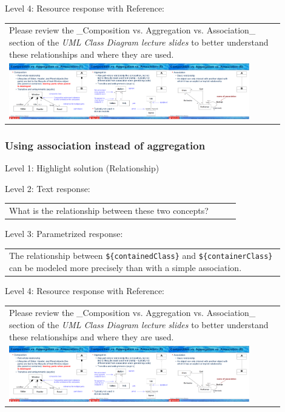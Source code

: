 \noindent Level 4: Resource response with Reference: \medskip

\begin{tabular}{|p{0.9\linewidth}}
Please review the _Composition vs. Aggregation vs. Association_ section of 
the \textit{UML Class Diagram lecture slides} to 
better understand these relationships and where they are used.

\\
\includegraphics[width=0.9\textwidth]{images/composition_aggregation_association.png}
\end{tabular} \medskip


\subsubsection{Using association instead of aggregation}

\noindent Level 1: Highlight solution (Relationship) \medskip

\noindent Level 2: Text response: \medskip

\begin{tabular}{|p{0.9\linewidth}}
What is the relationship between these two concepts?
\end{tabular} \medskip

\noindent Level 3: Parametrized response: \medskip

\begin{tabular}{|p{0.9\linewidth}}
The relationship between \verb|${containedClass}| and \verb|${containerClass}| can be modeled more precisely than with a simple association.
\end{tabular} \medskip

\noindent Level 4: Resource response with Reference: \medskip

\begin{tabular}{|p{0.9\linewidth}}
Please review the _Composition vs. Aggregation vs. Association_ section of 
the \textit{UML Class Diagram lecture slides} to 
better understand these relationships and where they are used.

\\
\includegraphics[width=0.9\textwidth]{images/composition_aggregation_association.png}
\end{tabular} \medskip


